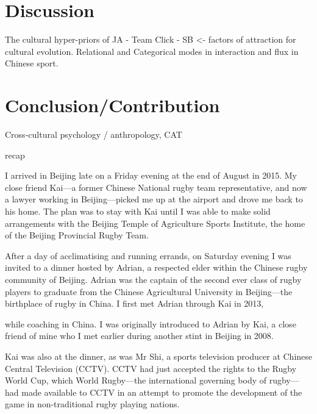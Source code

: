 \section{Discussion}

The cultural hyper-priors of JA - Team Click - SB <- factors of attraction for cultural evolution.
Relational and Categorical modes in interaction and flux in Chinese sport.

\section{Conclusion/Contribution}
Cross-cultural psychology / anthropology, CAT

recap





























I arrived in Beijing late on a Friday evening at the end of August in 2015.  My close friend Kai---a former Chinese National rugby team representative, and now a lawyer working in Beijing---picked me up at the airport and drove me back to his home.  The plan was to stay with Kai until I was able to make solid arrangements with the Beijing Temple of Agriculture Sports Institute, the home of the Beijing Provincial Rugby Team.

After a day of acclimatising and running errands, on Saturday evening I was invited to a dinner hosted by Adrian, a respected elder within the Chinese rugby community of Beijing.  Adrian was the captain of the second ever class of rugby players to graduate from the Chinese Agricultural University in Beijing---the birthplace of rugby in China.
I first met Adrian through Kai in 2013,

 while coaching in China.  I was originally introduced to Adrian by Kai, a close friend of mine who I met earlier during another stint in Beijing in 2008.

 Kai was also at the dinner, as was Mr Shi, a sports television producer at Chinese Central Television (CCTV).  CCTV had just accepted the rights to the Rugby World Cup, which World Rugby---the international governing body of rugby---had made available to CCTV in an attempt to promote the development of the game in non-traditional rugby playing nations.


